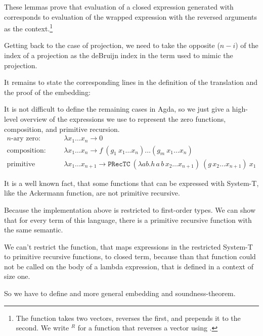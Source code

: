 \documentclass{jfp}
\newcommand{\xs}[1]{x_1\dots x_{#1}}
\begin{document}



These lemmas prove that evaluation of a closed expression generated with
 corresponds to evaluation of the wrapped
expression with the reversed arguments as the context.\footnote{
The function  takes two vectors, reverses the first,
and prepends it to the second. We write $^R$ for a function that
reverses a vector using .
}

Getting back to the case of projection, we need to take the opposite ($n - i$) of the index of a
projection as the deBruijn index in the term used to mimic the projection.

\mkProj

\lookupOpRev

It remains to state the corresponding lines in the definition of the
translation and the proof of the embedding:
\prToStProj
\embedPRSTSoundProj

It is not difficult to define the remaining cases in Agda, so we just
give a high-level overview of the expressions we use to represent the zero functions, composition, and primitive recursion.
\begin{align*}
  \text{$n$-ary zero: } & \lambda \xs{n} \rightarrow 0 \\
  \text{composition: } & \lambda \xs{n} \rightarrow  f \ (g_1 \ \xs{n})
                        \dots (g_m \ \xs{n}) \\
  \text{primitive recursion: } & \lambda \xs{n+1} \rightarrow \mathtt{PRecTC} \ (\lambda a b . h \, a \, b \, x_2 \dots x_{n+1}) \ (g \, x_2 \dots x_{n+1}) \ x_1 
\end{align*}


It is a well known fact, that some functions that can be expressed with System-T, like the Ackermann function, are not primitive recursive. 

Because the implementation above is restricted to first-order types. We can show that for every term of this language, there is a primitive recursive function with the same semantic. 

We can't restrict the function, that maps expressions in the restricted System-T to primitive recursive functions, to closed term, because than that function could not be called on the body of a lambda expression, that is defined in a context of size one.  


So we have to define and more general embedding and soundness-theorem.

\end{document}
